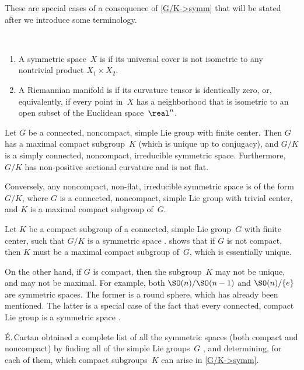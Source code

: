 These are special cases of a consequence of
\cref{G/K->symm} that will be stated after we introduce some terminology.

\begin{defns} \ 
\noprelistbreak
	\begin{enumerate}
	\item A symmetric space~$X$ is  if its universal cover is not isometric to any
nontrivial product $X_1 \times X_2$.
	\item A Riemannian manifold is  if its curvature tensor is identically zero, or, equivalently, if every point in~$X$ has a neighborhood that is isometric to an open subset of the Euclidean space~$\real^n$.
	\end{enumerate}
 \end{defns}

\begin{prop} \label{noncpctsymm<>simplegrp}
 Let $G$ be a connected, noncompact, simple Lie group with finite
center. Then $G$ has a maximal compact subgroup~$K$ \textup(which
is unique up to conjugacy\textup), and $G/K$ is a simply
connected, noncompact, irreducible symmetric space.
Furthermore, $G/K$ has non-positive sectional curvature and is not flat.

Conversely, any noncompact, non-flat, irreducible symmetric space is
of the form $G/K$, where $G$ is a connected, noncompact, simple Lie
group with trivial center, and $K$ is a maximal compact subgroup
of~$G$.
 \end{prop}

\begin{rem}
 Let $K$ be a compact subgroup of a connected, simple Lie group~$G$
with finite center, such that $G/K$ is a symmetric space
.  shows that if $G$ is not compact,
then $K$ must be a maximal compact subgroup of~$G$, which is
essentially unique. 

On the other hand, if $G$ is compact, then the subgroup~$K$ may not
be unique, and may not be maximal. For example, both
$\SO(n)/\SO(n-1)$ and $\SO(n)/\{e\}$ are symmetric spaces. The former
is a round sphere, which has already been mentioned. The latter is a
special case of the fact that every connected, compact Lie group is a
symmetric space \csee{X=G}.

\'E.\,Cartan obtained a complete list of all the symmetric spaces
(both compact and noncompact) by finding all of the simple Lie
groups~$G$ , and determining, for each of them, which compact subgroups~$K$ can arise in
\cref{G/K->symm}.
 \end{rem}


